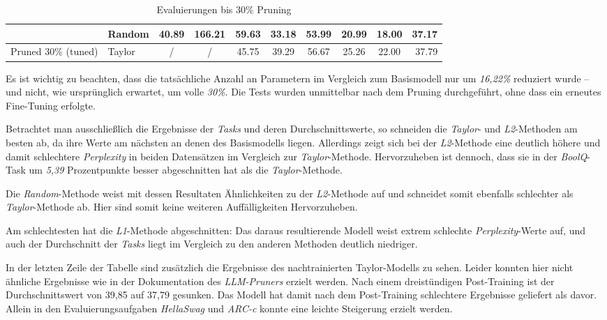 \begin{table}[h]
{\begin{tabular}{l l | c c | c c c c c | r}
			                             & Random          & 40.89              & 166.21
			                             & 59.63           & 33.18              & 53.99
			                             & 20.99           & 18.00              & 37.17              \\
			\midrule
			Pruned 30\% (tuned)          & Taylor          & /                  & /
			                             & 45.75           & 39.29              & 56.67
			                             & 25.26           & 22.00              & 37.79              \\
			\bottomrule
			\bottomrule
		\end{tabular}}
	\caption{Evaluierungen bis 30\% Pruning}
	\label{tab:pruning30}
\end{table}

Es ist wichtig zu beachten, dass die tatsächliche Anzahl an Parametern im
Vergleich zum Basismodell nur um \emph{16,22\%} reduziert wurde – und nicht, wie
ursprünglich erwartet, um volle \emph{30\%}. Die Tests wurden unmittelbar nach
dem Pruning durchgeführt, ohne dass ein erneutes Fine-Tuning erfolgte.

Betrachtet man ausschließlich die Ergebnisse der \emph{Tasks} und deren
Durchschnittswerte, so schneiden die \emph{Taylor}- und \emph{L2}-Methoden am
besten ab, da ihre Werte am nächsten an denen des Basismodells liegen.
Allerdings zeigt sich bei der \emph{L2}-Methode eine deutlich höhere und damit
schlechtere \emph{Perplexity} in beiden Datensätzen im Vergleich zur
\emph{Taylor}-Methode. Hervorzuheben ist dennoch, dass sie in der
\emph{BoolQ}-Task um \emph{5,39} Prozentpunkte besser abgeschnitten hat als die
\emph{Taylor}-Methode.

Die \emph{Random}-Methode weist mit dessen Resultaten Ähnlichkeiten zu der
\emph{L2}-Methode auf und schneidet somit ebenfalls schlechter als
\emph{Taylor}-Methode ab. Hier sind somit keine weiteren Auffälligkeiten
Hervorzuheben.

Am schlechtesten hat die \emph{L1}-Methode abgeschnitten: Das daraus
resultierende Modell weist extrem schlechte \emph{Perplexity}-Werte auf, und
auch der Durchschnitt der \emph{Tasks} liegt im Vergleich zu den anderen
Methoden deutlich niedriger.

In der letzten Zeile der Tabelle sind zusätzlich die Ergebnisse des
nachtrainierten Taylor-Modells zu sehen. Leider konnten hier nicht ähnliche
Ergebnisse wie in der Dokumentation des \emph{LLM-Pruners} erzielt werden. Nach
einem dreistündigen Post-Training ist der Durchschnittswert von 39,85 auf 37,79
gesunken. Das Modell hat damit nach dem Post-Training schlechtere Ergebnisse
geliefert als davor. Allein in den Evaluierungsaufgaben \emph{HellaSwag} und
\emph{ARC-c} konnte eine leichte Steigerung erzielt werden.


